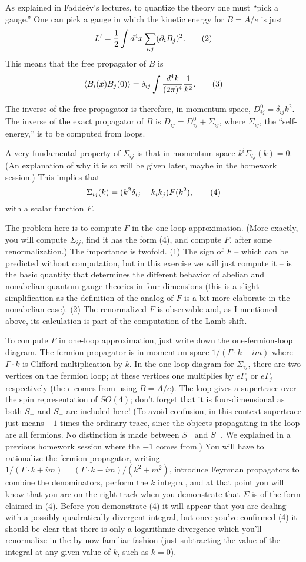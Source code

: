 As explained in Fadde\'ev's lectures, to quantize the theory
one must ``pick a gauge.'' One can pick a gauge in which the
kinetic energy for $B=A/e$ is just
$$
L'={1\over 2}\int d^4x \sum_{i.j}(\partial_i B_j)^2.
\tag2
$$
This means that the free propagator of $B$ is
$$
\langle 
B_i(x)B_j(0)\rangle=\delta_{ij}\int {d^4k\over (2\pi)^4}
{1\over k^2}.\tag3
$$

The inverse of the free propagator is therefore, in momentum
space, $ D_{ij}^0=\delta_{ij}k^2$.
The inverse of the exact propagator of 
$B$ is $D_{ij}=D_{ij}^0+
\Sigma_{ij}$, where $\Sigma_{ij}$, the ``self-energy,'' is
to be computed from loops.

A very fundamental property of $\Sigma_{ij}$ 
is that in momentum space
$k^i\Sigma_{ij}(k)=0$.  (An explanation of why it is so will
be given later, maybe in the homework session.) 
This implies that
$$
\Sigma_{ij}(k)=(k^2\delta_{ij}-k_ik_j)F(k^2),
\tag4
$$
with a scalar function $F$.  

The problem here is to compute $F$ in the one-loop approximation.
(More exactly, you will compute $\Sigma_{ij}$, find it has the
form (4), and compute $F$, after some renormalization.)
The importance is twofold. (1) 
The sign of $F$ -- which can be predicted
without computation, but in this exercise we will just compute
it -- is the basic quantity that determines the different
behavior of abelian and nonabelian quantum gauge theories in
four dimensions (this is a slight 
simplification as the definition
of the analog of $F$ is a bit more 
elaborate in the nonabelian case).
(2) The renormalized $F$ is observable and, as I mentioned above,
its calculation is part of the  computation of the Lamb shift.

To compute $F$ in one-loop approximation, just write down
the one-fermion-loop diagram.
The fermion propagator is in momentum 
space $1/(\Gamma\cdot k+im)$
where $\Gamma\cdot k$ is Clifford multiplication by $k$. In the
one loop diagram for $\Sigma_{ij}$, there are two vertices on
the fermion loop; at these vertices one multiplies by $e\Gamma_i$
or $e\Gamma_j$ respectively (the $e$ comes from using $B=A/e$).
The loop gives a supertrace over the spin representation of
$SO(4)$; don't forget that it is four-dimensional as both
$S_+$ and $S_-$ are included here!  
(To avoid confusion, in this context supertrace 
just means $-1$ times
the ordinary trace, since the objects propagating in the loop
are all fermions.  
No distinction is made between $S_+$ and $S_-$.
We explained in a previous homework session 
where the $-1$ comes from.) 
You will have to rationalize
the fermion propagator, writing $1/(\Gamma\cdot k+im)=
(\Gamma\cdot k-im)/(k^2+m^2)$, introduce Feynman propagators
to combine the denominators, perform the $k$ integral, and
at that point you will know that you are on the right 
track when
you demonstrate that $\Sigma$ is of the form claimed in (4).
Before you demonstrate (4) it will appear that you are
dealing with a possibly quadratically divergent integral,
but once you've confirmed (4) it should be clear that there
is only a logarithmic divergence which you'll 
renormalize in the
by now familiar fashion (just subtracting the 
value of the integral
at any given value of $k$, such as $k=0$).  


